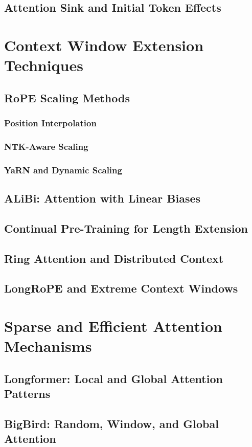 \documentclass[12pt, letterpaper]{article}
\begin{document}
\subsection{Attention Sink and Initial Token Effects}

\section{Context Window Extension Techniques}
\subsection{RoPE Scaling Methods}
\subsubsection{Position Interpolation}
\subsubsection{NTK-Aware Scaling}
\subsubsection{YaRN and Dynamic Scaling}
\subsection{ALiBi: Attention with Linear Biases}
\subsection{Continual Pre-Training for Length Extension}
\subsection{Ring Attention and Distributed Context}
\subsection{LongRoPE and Extreme Context Windows}

\section{Sparse and Efficient Attention Mechanisms}
\subsection{Longformer: Local and Global Attention Patterns}
\subsection{BigBird: Random, Window, and Global Attention}
\end{document}
